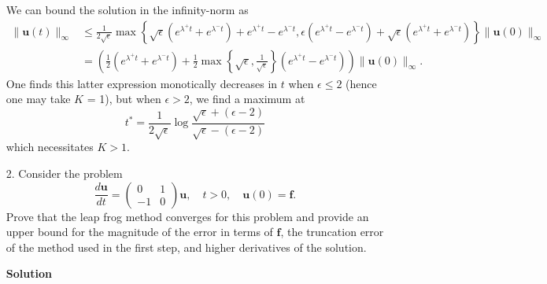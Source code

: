 \documentclass{article}
\begin{document}
\begin{itemize}
We can bound the solution in the infinity-norm as
\begin{align*}
\lVert \mathbf{u}(t) \rVert_{\infty}
& \leq \frac{1}{2 \sqrt{\epsilon}} \max \left\{ \sqrt{\epsilon} \left( e^{\lambda^+t} + e^{\lambda^-t} \right) + e^{\lambda^+t} - e^{\lambda^-t}, \epsilon \left( e^{\lambda^+t} - e^{\lambda^-t} \right) + \sqrt{\epsilon} \left( e^{\lambda^+t} + e^{\lambda^-t} \right) \right\} \lVert \mathbf{u}(0) \rVert_{\infty} \\
& = \left( \frac{1}{2} \left( e^{\lambda^+t} + e^{\lambda^-t} \right) + \frac{1}{2} \max \left\{ \sqrt{\epsilon}, \frac{1}{\sqrt{\epsilon}} \right\} \left( e^{\lambda^+t} - e^{\lambda^-t} \right) \right) \lVert \mathbf{u}(0) \rVert_{\infty}.
\end{align*}
One finds this latter expression monotically decreases in $t$ when $\epsilon \leq 2$ (hence one may take $K$ = 1), but when $\epsilon > 2$, we find a maximum at
\begin{equation*}
t^* = \frac{1}{2 \sqrt{\epsilon}} \log \frac{\sqrt{\epsilon} + (\epsilon - 2)}{\sqrt{\epsilon} - (\epsilon - 2)}
\end{equation*}
which necessitates $K > 1$.

\item[2.] Consider the problem
\begin{equation*}
\frac{d\mathbf{u}}{dt} = \begin{pmatrix} 0 & 1 \\ -1 & 0 \end{pmatrix} \mathbf{u}, \quad t > 0, \quad \mathbf{u}(0) = \mathbf{f}.
\end{equation*}
Prove that the leap frog method converges for this problem and provide an upper bound for the magnitude of the error in terms of $\mathbf{f}$, the truncation error of the method used in the first step, and higher derivatives of the solution.

{\bf Solution}


\end{itemize}
\end{document}
